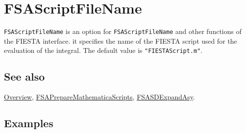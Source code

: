 \documentclass[../FeynHelpersManual.tex]{subfiles}
\begin{document}
\begin{Shaded}
\begin{Highlighting}[]
 
\end{Highlighting}
\end{Shaded}

\hypertarget{fsascriptfilename}{
\section{FSAScriptFileName}\label{fsascriptfilename}}

\texttt{FSAScriptFileName} is an option for \texttt{FSAScriptFileName}
and other functions of the FIESTA interface. it specifies the name of
the FIESTA script used for the evaluation of the integral. The default
value is \texttt{"FIESTAScript.m"}.

\subsection{See also}

\hyperlink{toc}{Overview},
\hyperlink{fsapreparemathematicascripts}{FSAPrepareMathematicaScripts},
\hyperlink{fsasdexpandasy}{FSASDExpandAsy}.

\subsection{Examples}
\end{document}
